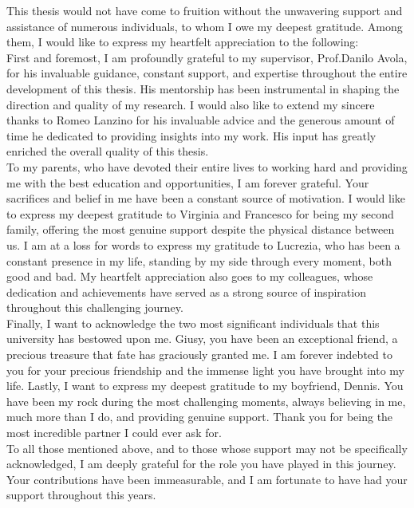 \documentclass[a4paper, noexaminfo]{sapthesis}
\begin{document}
\begin{acknowledgments}
  This thesis would not have come to fruition without the unwavering 
  support and assistance of numerous individuals, to whom I owe my 
  deepest gratitude. Among them, I would like to express my heartfelt 
  appreciation to the following:\newline \\
  First and foremost, I am profoundly grateful to my supervisor, 
  Prof.Danilo Avola, for his invaluable guidance, constant support, 
  and expertise throughout the entire development of this thesis. 
  His mentorship has been instrumental in shaping the direction and 
  quality of my research.\newline 
  I would also like to extend my sincere thanks to Romeo Lanzino for 
  his invaluable advice and the generous amount of time he dedicated 
  to providing insights into my work. His input has greatly enriched 
  the overall quality of this thesis.\newline \\
  To my parents, who have devoted their entire lives to working hard 
  and providing me with the best education and opportunities, I am 
  forever grateful. Your sacrifices and belief in me have 
  been a constant source of motivation.\newline 
  I would like to express my deepest gratitude to Virginia and 
  Francesco for being my second family, offering the most genuine
  support 
  despite the physical distance between us. \newline 
  I am at a loss for words 
  to express my gratitude to Lucrezia, who has been a constant 
  presence in my life, standing by my side through every moment, 
  both good and bad.
  \newline 
  My heartfelt appreciation also goes to my colleagues, whose dedication 
  and achievements have served as a strong source of inspiration 
  throughout this challenging journey.\newline \\
  Finally, I want to acknowledge the two most significant individuals 
  that this university has bestowed upon me. \newline 
  Giusy, you have been an 
  exceptional friend, a precious treasure that fate has graciously 
  granted me. I am forever indebted to you for your precious friendship 
  and the immense light you have brought into my life.
  \newline 
  Lastly, I want to express my deepest gratitude to my boyfriend, 
  Dennis. You have been my rock during the most challenging moments, 
  always believing in me, much more than I do,
   and providing genuine support. Thank you 
  for being the most incredible partner I could ever ask for.
  \newline \\
  To all those mentioned above, and to those whose support may not be 
  specifically acknowledged, I am deeply grateful for the role you have 
  played in this journey. Your contributions have been immeasurable, 
  and I am fortunate to have had your support throughout this years.

\end{acknowledgments}
\tableofcontents
\end{document}
